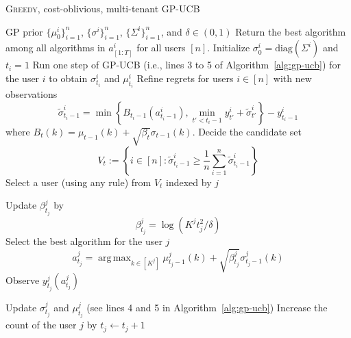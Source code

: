\documentclass[letterpaper]{vldb}
\newcommand{\greedy}{\textsc{Greedy}\xspace}
\DeclareMathOperator*{\argmax}{arg\,max}
\begin{document}
\begin{algorithm} [t!]                     %
\small
\caption{\greedy, cost-oblivious, multi-tenant GP-UCB}          %
\label{alg:mc-general}                           %
\begin{algorithmic}[1]                    %
   \REQUIRE GP prior $\{\mu_0^i\}_{i=1}^n$, $\{\sigma^i\}_{i=1}^n$, $\{\Sigma^i\}_{i=1}^n$, and $\delta\in (0,1)$
   \ENSURE Return the best algorithm among all algorithms in $a_{[1:T]}^i$ for all users $[n]$.
       \STATE Initialize $\sigma_0^i = \text{diag}(\Sigma^i)$ and $t_i=1$
       \STATE Run one step of GP-UCB (i.e., lines 3 to 5 of Algorithm~\ref{alg:gp-ucb}) for the user $i$ to obtain $\sigma^i_{t_i}$ and $\mu^i_{t_i}$
   \ENDFOR
        \STATE Refine regrets for users $i\in[n]$ with new observations
        \[
   \tilde{\sigma}^i_{t_i-1} = \min\left\{B_{t_i-1}(a^i_{t_i-1}), \min_{t'<t_i-1} y^i_{t'}+ \tilde{\sigma}^{i}_{t'} \right\} - y^i_{t_i-1} 
   \]
   where $
   B_t(k)=\mu_{t-1}(k) + \sqrt{\beta_t}\sigma_{t-1}(k)$.
      \STATE Decide the candidate set
   \[
     V_t := \left\{ i\in [n]: 
         \tilde{\sigma}^i_{t_i-1} \ge \frac{1}{n}
       \sum_{i=1}^n 
         \tilde{\sigma}^i_{t_i-1}\right\}
   \]
   \STATE Select a user (using any rule) from $V_t$ indexed by $j$

   \STATE  Update $\beta_{t_j}^j$ by
   \[
     \beta_{t_j}^j = \log (K^j t_j^2/\delta)
   \]
   \STATE Select the best algorithm for the user $j$
   \[
     a^j_{t_j} = \argmax_{k\in [K^j]}\mu^j_{{t_j}-1}(k) + \sqrt{\beta^j_{t_j}}\sigma^j_{t_j-1}(k)
     \]
     \STATE Observe $y^j_{t_j}(a^j_{t_j})$

     \STATE Update $\sigma^j_{t_j}$ and $\mu^j_{t_j}$ (see lines 4 and 5 in Algorithm~\ref{alg:gp-ucb})
        \STATE Increase the count of the user $j$ by $t_j \leftarrow t_j + 1$
   \ENDFOR
\end{algorithmic}
\end{algorithm}
\end{document}
